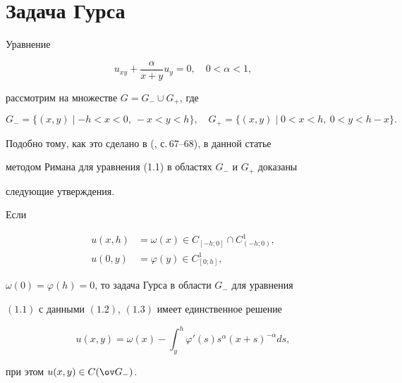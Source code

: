 \maketitle 


\label{begin} 


 


 


\section{Задача Гурса} 


 


Уравнение 


\begin{equation} 


u_{x y}+\frac{\alpha}{x+y}u_y=0,\quad 0<\alpha<1, 


\end{equation} 


рассмотрим на множестве $G=G_-\cup G_+$, где 


$$ 


G_-=\{(x,y)\mid -h<x<0,\ -x<y<h\},\quad 


G_+=\{(x,y)\mid 0<x<h,\ 0<y<h-x\}. 


$$ 


 


Подобно тому, как это сделано в (\cite{1}, с.\,67--68), в данной статье 


методом Римана для уравнения (1.1) в областях $G_-$ и $G_+$ доказаны 


следующие утверждения. 


 


\begin{thm} 


Если 


\begin{align} 


u(x,h)&=\omega(x)\in C_{[-h;0]}\cap C^1_{(-h;0)},\\ 


u(0,y)&=\varphi(y)\in C^1_{[0;h]}, 


\end{align} 


$\omega(0)=\varphi(h)=0$, то задача Гурса в области $G_-$ для уравнения 


$(1.1)$ с данными $(1.2)$, $(1.3)$ имеет единственное решение 


\begin{equation} 


u(x,y)=\omega(x)-\int^h_y \varphi'(s)s^\alpha(x+s)^{-\alpha}d s, 


\end{equation} 


при этом $u(x,y)\in C(\ov G_-)$. 


\end{thm} 


